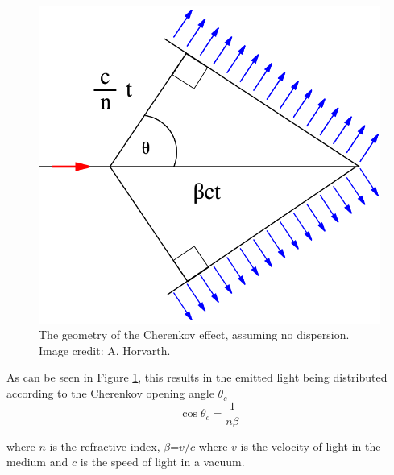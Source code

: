 \begin{figure}[t] 
        \centering \includegraphics[width=0.5\columnwidth]{figures/Cherenkov.png}

        \caption{
                \label{fig:cherenkov} %
                The geometry of the Cherenkov effect, assuming no dispersion. Image credit: A. Horvarth.
        }
\end{figure}

As can be seen in Figure \ref{fig:cherenkov}, this results in the emitted light being distributed according to the Cherenkov opening angle $\theta_c$
\begin{equation}
    \cos\theta_c=\frac{1}{n\beta}
    \label{eq:cherenkov}
\end{equation}

where $n$ is the refractive index, $\beta$=$v/c$ where $v$ is the velocity of light in the medium and $c$ is the speed of light in a vacuum.

